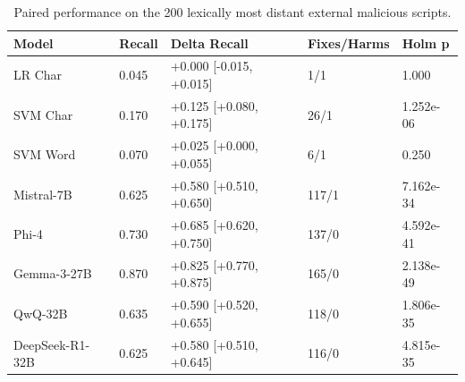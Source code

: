 \begin{table}
\caption{Paired performance on the 200 lexically most distant external malicious scripts.}
\label{tab:q1_distance_stats}
\begin{tabular}{lllll}
\toprule
Model & Recall & Delta Recall & Fixes/Harms & Holm p \\
\midrule
LR Char & 0.045 & +0.000 [-0.015, +0.015] & 1/1 & 1.000 \\
SVM Char & 0.170 & +0.125 [+0.080, +0.175] & 26/1 & 1.252e-06 \\
SVM Word & 0.070 & +0.025 [+0.000, +0.055] & 6/1 & 0.250 \\
Mistral-7B & 0.625 & +0.580 [+0.510, +0.650] & 117/1 & 7.162e-34 \\
Phi-4 & 0.730 & +0.685 [+0.620, +0.750] & 137/0 & 4.592e-41 \\
Gemma-3-27B & 0.870 & +0.825 [+0.770, +0.875] & 165/0 & 2.138e-49 \\
QwQ-32B & 0.635 & +0.590 [+0.520, +0.655] & 118/0 & 1.806e-35 \\
DeepSeek-R1-32B & 0.625 & +0.580 [+0.510, +0.645] & 116/0 & 4.815e-35 \\
\bottomrule
\end{tabular}
\end{table}
